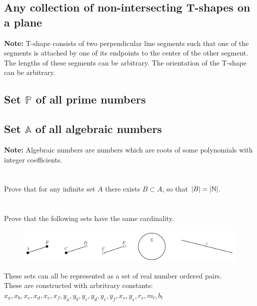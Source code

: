\documentclass[]{article}
\newcommand{\N}{\mathbb{N}}
\begin{document}
\subsection{Any collection of non-intersecting T-shapes on a plane}
\textbf{Note:} T-shape consists of two perpendicular line segments such that 
one of the segments is attached by one of its endpoints to the center of the other segment. 
The lengths of these segments can be arbitrary. The orientation of the T-shape can be arbitrary.




\subsection{Set $\mathbb{P}$ of all prime numbers}



\subsection{Set $\mathbb{A}$ of all algebraic numbers}
\textbf{Note:} Algebraic numbers are numbers which are roots of 
some polynomials with integer coefficients.








\newpage
\section{}
Prove that for any infinite set $A$ there exists $B \subset A$, so that $\abs{B}=\abs{\N}$.










\newpage
\section{}
Prove that the following sets have the same cardinality.
\begin{figure}[h]
	\centering
	\includegraphics[width=\textwidth]{fig/pblm6.png}
\end{figure}

These sets can all be represented as a set of real number ordered pairs.\\
These are constructed with arbritrary constants: 
$x_a,x_b,x_c,x_d,x_e,x_f,y_a,y_b,y_c,y_d,y_e,y_f,x_s,y_s,r_s,m_l,b_l$
\end{document}

